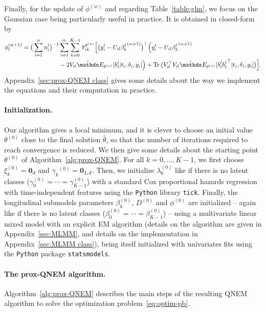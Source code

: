\documentclass[11pt]{article}
\DeclareMathOperator{\Tr}{Tr}
\newcommand{\cA}{\mathcal A}
\newcommand{\E}{\mathds E}
\begin{document}
Finally, for the update of $\phi^{(w)}$ and regarding Table~\ref{table:glm}, we focus on the Gaussian case being particularly useful in practice. It is obtained in closed-form by
\begin{align}
  \label{eq:update_phi}
  \phi_l^{(w+1)} = \big(\sum_{i=1}^n n_i^l \big)^{-1} &\sum_{i=1}^n \sum_{k=0}^{K-1} \hat \pi_{ik}^{\theta^{(w)}} \Big[ \big(y_i^l - U_{il} {\beta_k^l}^{(w+1)}\big)^\top \Big(y_i^l - U_{il} {\beta_k^l}^{(w+1)} \nonumber \\
  & - 2V_{il} \hat \E_{\theta^{(w)}}[ b_i^l | t_i, \delta_i, y_i]\Big) + \Tr\big(V_{il}^\top V_{il}\hat \E_{\theta^{(w)}}[ b_i^l {b_i^l}^\top | t_i, \delta_i, y_i]\big) \Big].
\end{align}
Appendix~\ref{sec:prox-QNEM class} gives some details about the way we implement the equations and their computation in practice.

\paragraph*{Initialization.}
Our algorithm gives a local minimum, and it is clever to choose an initial value $\theta^{(0)}$ close to the final solution $\hat \theta$, so that the number of iterations required to reach convergence is reduced. We then give some details about the starting point $\theta^{(0)}$ of Algorithm~\ref{alg:prox-QNEM}.
For all $k = 0, \ldots, K-1$, we first choose $\xi_k^{(0)} = \mathbf{0}_d$ and ${\gamma_k}^{(0)} = \mathbf{0}_{L\cA}$. Then, we initialize $\lambda_0^{(0)}$ like if there is no latent classes ($\gamma_{0}^{(0)} = \cdots = \gamma_{K-1}^{(0)}$) with a standard Cox proportional hazards regression with time-independent features using the \texttt{Python} library \texttt{tick}. Finally, the longitudinal submodels parameters $\beta_k^{(0)}$, $D^{(0)}$ and $\phi^{(0)}$ are initialized -- again like if there is no latent classes ($\beta_0^{(0)} = \cdots = \beta_{K-1}^{(0)}$) -- using a multivariate linear mixed model with an explicit EM algorithm (details on the algorithm are given in Appendix~\ref{sec:MLMM}, and details on the implementation in Appendix~\ref{sec:MLMM class}), being itself initialized with univariates fits using the \texttt{Python} package \texttt{statsmodels}.

\paragraph*{The prox-QNEM algorithm.}
Algorithm~\ref{alg:prox-QNEM} describes the main steps of the resulting QNEM algorithm to solve the optimization problem~\eqref{eq:optim-pb}.
\end{document}
